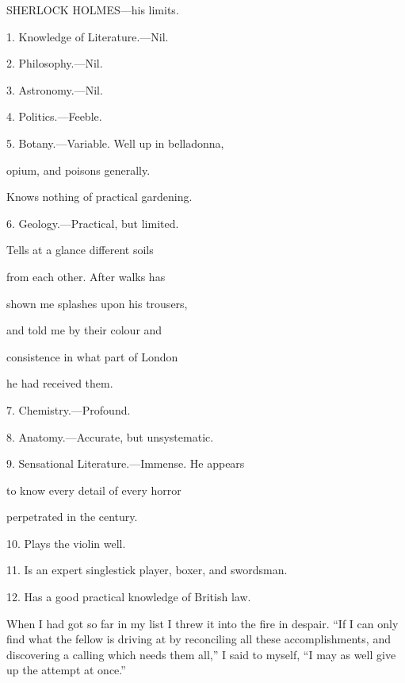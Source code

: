 \documentclass[12pt]{book}
\begin{document}
SHERLOCK HOLMES—his limits. 

  1. Knowledge of Literature.—Nil.

  2.              Philosophy.—Nil.

  3.              Astronomy.—Nil.

  4.              Politics.—Feeble.

  5.              Botany.—Variable.  Well up in belladonna,

                              opium, and poisons generally.

                              Knows nothing of practical gardening.

  6.              Geology.—Practical, but limited.

                               Tells at a glance different soils

                               from each other.  After walks has

                               shown me splashes upon his trousers,

                               and told me by their colour and

                               consistence in what part of London

                               he had received them.

  7.              Chemistry.—Profound.

  8.              Anatomy.—Accurate, but unsystematic.

  9.              Sensational Literature.—Immense.  He appears

                              to know every detail of every horror

                              perpetrated in the century.

  10. Plays the violin well.

  11. Is an expert singlestick player, boxer, and swordsman.

  12. Has a good practical knowledge of British law.

When I had got so far in my list I threw it into the fire in despair. “If I can only find what the fellow is driving at by reconciling all these accomplishments, and discovering a calling which needs them all,” I said to myself, “I may as well give up the attempt at once.” 
\end{document}
